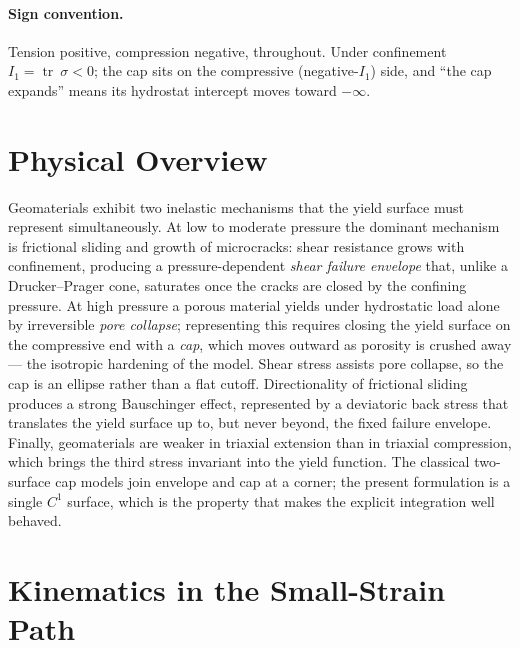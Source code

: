 \documentclass[12pt]{article}
\DeclareMathOperator{\trace}{tr}
\newcommand{\stress}{~\sigma}
\begin{document}
\paragraph{Sign convention.}
Tension positive, compression negative, throughout. Under
confinement $I_1 = \trace\stress < 0$; the cap sits on the
compressive (negative-$I_1$) side, and ``the cap expands'' means its
hydrostat intercept moves toward $-\infty$.

\section{Physical Overview}
\label{sec:physics}

Geomaterials exhibit two inelastic mechanisms that the yield surface
must represent simultaneously. At low to moderate pressure the
dominant mechanism is frictional sliding and growth of microcracks:
shear resistance grows with confinement, producing a pressure-dependent
\emph{shear failure envelope} that, unlike a Drucker--Prager cone,
saturates once the cracks are closed by the confining pressure. At high pressure a
porous material yields under hydrostatic load alone by irreversible
\emph{pore collapse}; representing this requires closing the yield
surface on the compressive end with a \emph{cap}, which moves outward
as porosity is crushed away --- the isotropic hardening of the model.
Shear stress assists pore collapse, so the cap is an ellipse rather
than a flat cutoff. Directionality of frictional sliding produces a
strong Bauschinger effect, represented by a deviatoric back stress
that translates the yield surface up to, but never beyond, the fixed
failure envelope. Finally, geomaterials are weaker in triaxial
extension than in triaxial compression, which brings the third stress
invariant into the yield function. The classical two-surface cap
models \citep[e.g.][]{Fossum.Fredrich:2000} join envelope and cap at
a corner; the present formulation is a single $C^1$ surface, which is
the property that makes the explicit integration well behaved.

\section{Kinematics in the Small-Strain Path}
\label{sec:smallstrain}
\end{document}
